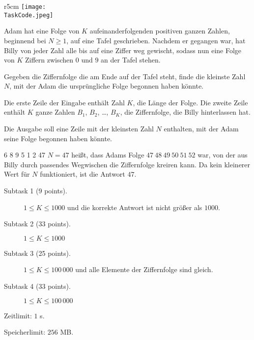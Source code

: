 \documentclass{boi2014-de}
\renewcommand{\TaskCode}{sequence}
\begin{document}
    \begin{wrapfigure}[5]{r}{5cm}
        \vspace{-24pt}
		\texttt{[image: \\TaskCode.jpeg]}
	\end{wrapfigure}

    Adam hat eine Folge von $K$ aufeinanderfolgenden positiven ganzen Zahlen, beginnend bei $N\ge1$, auf eine Tafel geschrieben.
    Nachdem er gegangen war, hat Billy von jeder Zahl alle bis auf eine Ziffer weg gewischt,
    sodass nun eine Folge von $K$ Ziffern zwischen $0$ und $9$ an der Tafel stehen.

    \Task

    Gegeben die Ziffernfolge die am Ende auf der Tafel steht, finde die kleinste Zahl $N$, mit der Adam die ursprüngliche Folge begonnen haben könnte.

    \Input

    Die erste Zeile der Eingabe enthält Zahl $K$, die Länge der Folge.
    Die zweite Zeile enthält $K$ ganze Zahlen $B_1$, $B_2$, \dots, $B_K$, die Ziffernfolge, die Billy hinterlassen hat.

    \Output

    Die Ausgabe soll eine Zeile mit der kleinsten Zahl $N$ enthalten, mit der Adam seine Folge begonnen haben könnte.

    \Example

    \example
    {
        6 8 9 5 1 2
    }
    {
        47
    }
    {
        $N = 47$ heißt, dass Adams Folge $47\ 48\ 49\ 50\ 51\ 52$ war, von der aus Billy durch passendes Wegwischen die Ziffernfolge kreiren kann. Da kein kleinerer Wert für $N$ funktioniert, ist die Antwort $47$.
    }

\Scoring

\begin{description}
    \item[Subtask 1 (9 points).] $1 \le K \le 1000$ und die korrekte Antwort ist nicht größer als $1000$.
    \item[Subtask 2 (33 points).] $1 \le K \le 1000$
    \item[Subtask 3 (25 points).] $1 \le K \le 100\,000$ und alle Elemente der Ziffernfolge sind gleich.
    \item[Subtask 4 (33 points).] $1 \le K \le 100\,000$
\end{description}

\Constraints

Zeitlimit: $1$ s.

Speicherlimit: $256$ MB.
\end{document}

